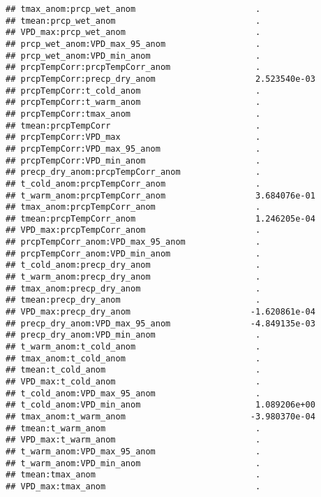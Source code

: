 \documentclass[
]{article}
\begin{document}
\begin{verbatim}
## tmax_anom:prcp_wet_anom                        .           
## tmean:prcp_wet_anom                            .           
## VPD_max:prcp_wet_anom                          .           
## prcp_wet_anom:VPD_max_95_anom                  .           
## prcp_wet_anom:VPD_min_anom                     .           
## prcpTempCorr:prcpTempCorr_anom                 .           
## prcpTempCorr:precp_dry_anom                    2.523540e-03
## prcpTempCorr:t_cold_anom                       .           
## prcpTempCorr:t_warm_anom                       .           
## prcpTempCorr:tmax_anom                         .           
## tmean:prcpTempCorr                             .           
## prcpTempCorr:VPD_max                           .           
## prcpTempCorr:VPD_max_95_anom                   .           
## prcpTempCorr:VPD_min_anom                      .           
## precp_dry_anom:prcpTempCorr_anom               .           
## t_cold_anom:prcpTempCorr_anom                  .           
## t_warm_anom:prcpTempCorr_anom                  3.684076e-01
## tmax_anom:prcpTempCorr_anom                    .           
## tmean:prcpTempCorr_anom                        1.246205e-04
## VPD_max:prcpTempCorr_anom                      .           
## prcpTempCorr_anom:VPD_max_95_anom              .           
## prcpTempCorr_anom:VPD_min_anom                 .           
## t_cold_anom:precp_dry_anom                     .           
## t_warm_anom:precp_dry_anom                     .           
## tmax_anom:precp_dry_anom                       .           
## tmean:precp_dry_anom                           .           
## VPD_max:precp_dry_anom                        -1.620861e-04
## precp_dry_anom:VPD_max_95_anom                -4.849135e-03
## precp_dry_anom:VPD_min_anom                    .           
## t_warm_anom:t_cold_anom                        .           
## tmax_anom:t_cold_anom                          .           
## tmean:t_cold_anom                              .           
## VPD_max:t_cold_anom                            .           
## t_cold_anom:VPD_max_95_anom                    .           
## t_cold_anom:VPD_min_anom                       1.089206e+00
## tmax_anom:t_warm_anom                         -3.980370e-04
## tmean:t_warm_anom                              .           
## VPD_max:t_warm_anom                            .           
## t_warm_anom:VPD_max_95_anom                    .           
## t_warm_anom:VPD_min_anom                       .           
## tmean:tmax_anom                                .           
## VPD_max:tmax_anom                              .           

\end{verbatim}
\end{document}
